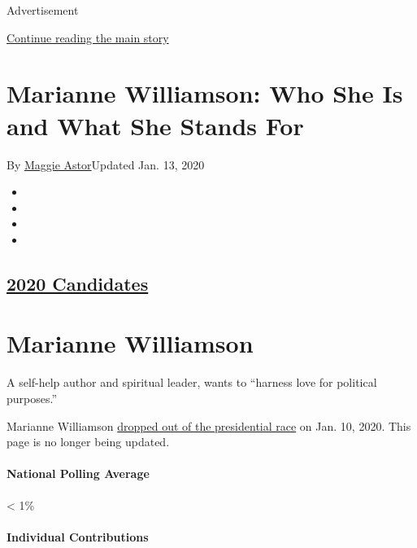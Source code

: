 Advertisement

\protect\hyperlink{after-top}{Continue reading the main story}

\hypertarget{marianne-williamson-who-she-is-and-what-she-stands-for}{%
\section{Marianne Williamson: Who She Is and What She Stands
For}\label{marianne-williamson-who-she-is-and-what-she-stands-for}}

By \href{https://www.nytimes3xbfgragh.onion/by/maggie-astor}{Maggie
Astor}Updated Jan. 13, 2020

\begin{itemize}
\item
\item
\item
\item
\end{itemize}

\hypertarget{2020-candidates}{%
\subsection{\texorpdfstring{\href{https://www.nytimes3xbfgragh.onion/interactive/2019/us/politics/2020-presidential-candidates.html}{2020
Candidates}}{2020 Candidates}}\label{2020-candidates}}

\hypertarget{marianne-williamson}{%
\section{Marianne Williamson}\label{marianne-williamson}}

A self-help author and spiritual leader, wants to ``harness love for
political purposes.''

Marianne Williamson
\href{https://www.nytimes3xbfgragh.onion/2020/01/10/us/politics/marianne-williamson-dropping-out.html}{dropped
out of the presidential race} on Jan. 10, 2020. This page is no longer
being updated.

\hypertarget{national-polling-average}{%
\paragraph{National Polling Average}\label{national-polling-average}}

\textless{} 1\%

\hypertarget{individual-contributions}{%
\paragraph{Individual Contributions}\label{individual-contributions}}

